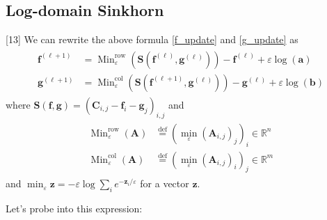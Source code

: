 \documentclass{article}
\begin{document}
\begin{large}
\subsection{Log-domain Sinkhorn}
[13] We can rewrite the above formula \ref{f_update} and \ref{g_update} as
\begin{align}
\begin{aligned} \mathbf { f } ^ { ( \ell + 1 ) } & = \operatorname { Min } _ { \varepsilon } ^ { \mathrm { row } } \left( \mathbf { S } \left( \mathbf { f } ^ { ( \ell ) } , \mathbf { g } ^ { ( \ell ) } \right) \right) - \mathbf { f } ^ { ( \ell ) } + \varepsilon \log ( \mathbf { a } ) \\ \mathbf { g } ^ { ( \ell + 1 ) } & = \operatorname { Min } _ { \varepsilon } ^ { \mathrm { col } } \left( \mathbf { S } \left( \mathbf { f } ^ { ( \ell + 1 ) } , \mathbf { g } ^ { ( \ell ) } \right) \right) - \mathbf { g } ^ { ( \ell ) } + \varepsilon \log ( \mathbf { b } ) \end{aligned}
\label{log update}
\end{align}
where $\mathbf { S } ( \mathbf { f } , \mathbf { g } ) = \left( \mathbf { C } _ { i , j } - \mathbf { f } _ { i } - \mathbf { g } _ { j } \right) _ { i , j }$ and
\begin{align}
\begin{aligned} \operatorname { Min } _ { \varepsilon } ^ { \mathrm { row } } ( \mathbf { A } ) &\stackrel { \mathrm { def } } { = } \left( \min _ { \varepsilon } \left( \mathbf { A } _ { i , j } \right) _ { j } \right) _ { i }  \in \mathbb { R } ^ { n } \\ \operatorname { Min } _ { \varepsilon } ^ { \mathrm { col } } ( \mathbf { A } ) &\stackrel { \mathrm { def} } { = }  \left( \min _ { \varepsilon } \left( \mathbf { A } _ { i , j } \right) _ { i } \right) _ { j } \in \mathbb { R } ^ { m } \end{aligned}
\end{align}
and $\min _ { \varepsilon } \mathbf { z } = - \varepsilon \log \sum _ { i } e ^ { - \mathbf { z } _ { i } / \varepsilon }$ for a vector $\mathbf{z}$.

Let's probe into this expression:


\end{large}
\end{document}
